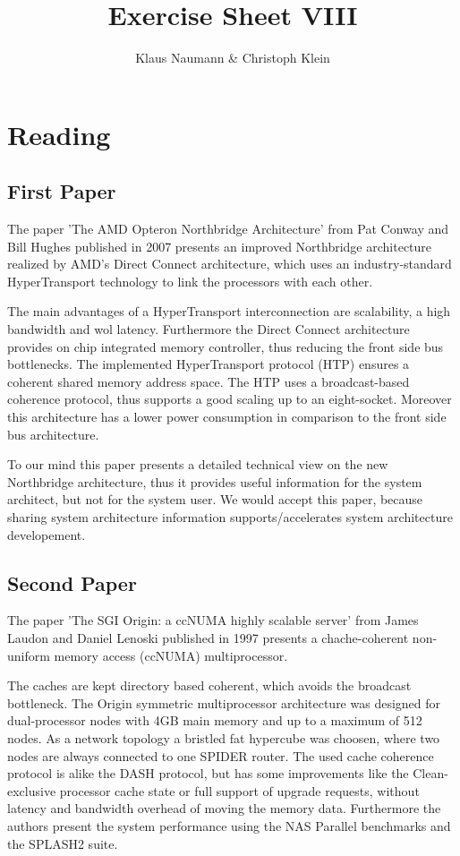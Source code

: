 \documentclass[oneside,a4paper]{scrartcl}
\begin{document}

\title{Exercise Sheet VIII}
\subject{Advanced Parallel Computing}
\author{Klaus Naumann \& Christoph Klein}
\maketitle

\section*{Reading}
\subsection*{First Paper}
The paper 'The AMD Opteron Northbridge Architecture' from Pat Conway and Bill Hughes
published in 2007 presents an improved Northbridge architecture realized by AMD's
Direct Connect architecture, which uses an industry-standard HyperTransport technology
to link the processors with each other.

The main advantages of a HyperTransport interconnection are scalability, a high
bandwidth and wol latency. Furthermore the Direct Connect architecture provides
on chip integrated memory controller, thus reducing the front side bus bottlenecks.
The implemented HyperTransport protocol (HTP) ensures a coherent shared memory address
space. The HTP uses a broadcast-based coherence protocol, thus supports a good scaling
up to an eight-socket. Moreover this architecture has a lower power consumption
in comparison to the front side bus architecture.

To our mind this paper presents a detailed technical view on the new Northbridge
architecture, thus it provides useful information for the system architect, but not for
the system user. We would accept this paper, because sharing system architecture information
supports/accelerates system architecture developement.

\subsection*{Second Paper}
The paper 'The SGI Origin: a ccNUMA highly scalable server' from James Laudon and Daniel
Lenoski published in 1997 presents a chache-coherent non-uniform memory access (ccNUMA)
multiprocessor.

The caches are kept directory based coherent, which avoids
the broadcast bottleneck. The Origin symmetric multiprocessor architecture was designed
for dual-processor nodes with 4GB main memory and up to a maximum of 512 nodes.
As a network topology a bristled fat hypercube was choosen, where two nodes are
always connected to one SPIDER router. The used cache coherence protocol is alike
the DASH protocol, but has some improvements like the Clean-exclusive processor cache
state or full support of upgrade requests, without latency and bandwidth overhead
of moving the memory data. Furthermore the authors present the system performance using
the NAS Parallel benchmarks and the SPLASH2 suite.
\end{document}
